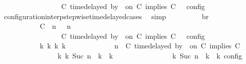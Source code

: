 \begin{isabellebody}
\ \ \ \ \ \ \ \ \ \ \ \ \ \ {\isasymturnstile}\ {\isasymPsi}\ {\isasymtriangleright}\ {\isacharparenleft}{\isacharparenleft}C\ time{\isacharminus}delayed\ by\ {\isasymdelta}{\isasymtau}\ on\ C\ implies\ C\ {\isacharhash}\ {\isasymPhi}{\isacharparenright}\ {\isasymrbrakk}\isactrlsub c\isactrlsub o\isactrlsub n\isactrlsub f\isactrlsub i\isactrlsub g{\isacartoucheclose}\isanewline
\ \ \ \ \ \ \ \ \isamarkupfalse%
\ configuration{\isacharunderscore}interp{\isacharunderscore}stepwise{\isacharunderscore}timedelayed{\isacharunderscore}cases\ \isamarkupfalse%
\ simp\isanewline
\ \ \ \ \ \ \isamarkupfalse%
\ \isamarkupfalse%
\ br{}{\isacharcolon}\isanewline
\ \ \ \ \ \ \ \ {\isacartoucheopen}{\isasymrho}\ {\isasymin}\ {\isasymlbrakk}\ {\isacharparenleft}{\isacharparenleft}C\ {\isasymnot}{\isasymUp}\ n{\isacharparenright}\ {\isacharhash}\ {\isasymGamma}{\isacharparenright}{\isacharcomma}\ n\isanewline
\ \ \ \ \ \ \ \ \ \ \ \ \ \ {\isasymturnstile}\ {\isasymPsi}\ {\isasymtriangleright}\ {\isacharparenleft}{\isacharparenleft}C\ time{\isacharminus}delayed\ by\ {\isasymdelta}{\isasymtau}\ on\ C\ implies\ C\ {\isacharhash}\ {\isasymPhi}{\isacharparenright}\ {\isasymrbrakk}\isactrlsub c\isactrlsub o\isactrlsub n\isactrlsub f\isactrlsub i\isactrlsub g\isanewline
\ \ \ \ \ \ \ \ \ \ {\isasymLongrightarrow}\ {\isasymexists}{\isasymGamma}\isactrlsub k\ {\isasymPsi}\isactrlsub k\ {\isasymPhi}\isactrlsub k\ k{\isachardot}\isanewline
\ \ \ \ \ \ \ \ \ \ \ \ {\isacharparenleft}{\isacharparenleft}{\isasymGamma}{\isacharcomma}\ n\ {\isasymturnstile}\ {\isacharparenleft}{\isacharparenleft}C\ time{\isacharminus}delayed\ by\ {\isasymdelta}{\isasymtau}\ on\ C\ implies\ C\ {\isacharhash}\ {\isasymPsi}{\isacharparenright}\ {\isasymtriangleright}\ {\isasymPhi}{\isacharparenright}\isanewline
\ \ \ \ \ \ \ \ \ \ \ \ \ \ \ \ {\isasymhookrightarrow}\isactrlbsup k\isactrlesup \ {\isacharparenleft}{\isasymGamma}\isactrlsub k{\isacharcomma}\ Suc\ n\ {\isasymturnstile}\ {\isasymPsi}\isactrlsub k\ {\isasymtriangleright}\ {\isasymPhi}\isactrlsub k{\isacharparenright}{\isacharparenright}\isanewline
\ \ \ \ \ \ \ \ \ \ \ \ {\isasymand}\ {\isasymrho}\ {\isasymin}\ {\isasymlbrakk}\ {\isasymGamma}\isactrlsub k{\isacharcomma}\ Suc\ n\ {\isasymturnstile}\ {\isasymPsi}\isactrlsub k\ {\isasymtriangleright}\ {\isasymPhi}\isactrlsub k\ {\isasymrbrakk}\isactrlsub c\isactrlsub o\isactrlsub n\isactrlsub f\isactrlsub i\isactrlsub g{\isacartoucheclose}\isanewline

\end{isabellebody}
